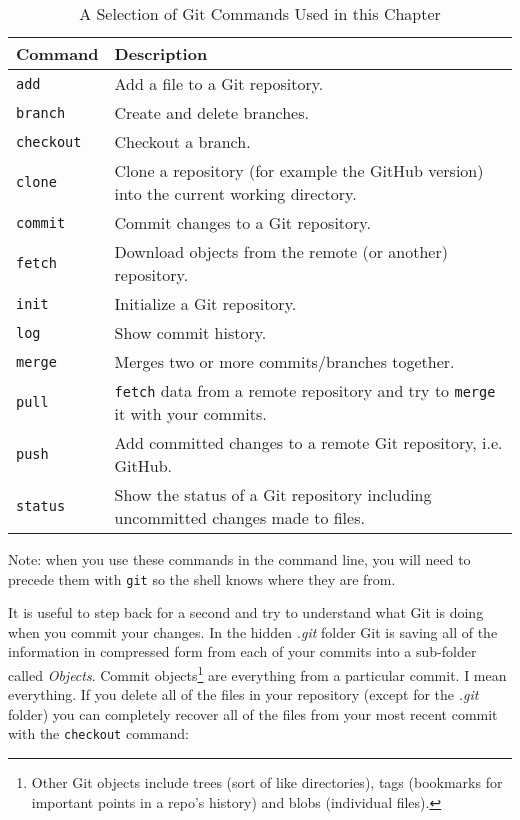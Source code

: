 \begin{table}
  \caption{A Selection of Git Commands Used in this Chapter}
  \begin{center}
  \label{GitCommandsTable}
  \begin{tabular}{l p{10cm}}
    \hline  
    Command & Description \\[0.25cm] \hline\hline
    \texttt{add} & Add a file to a Git repository. \\[0.25cm]
    \texttt{branch} & Create and delete branches. \\[0.25cm]
    \texttt{checkout} & Checkout a branch. \\[0.25cm]
    \texttt{clone} & Clone a repository (for example the GitHub version) into the current working directory. \\[0.25cm]
    \texttt{commit} & Commit changes to a Git repository. \\[0.25cm] 
    \texttt{fetch} & Download objects from the remote (or another) repository. \\[0.25cm] 
    \texttt{init} & Initialize a Git repository. \\[0.25cm]
    \texttt{log} & Show commit history. \\[0.25cm]
    \texttt{merge} & Merges two or more commits/branches together. \\[0.25cm]
    \texttt{pull} & \texttt{fetch} data from a remote repository and try to \texttt{merge} it with your commits. \\[0.25cm]
    \texttt{push} & Add committed changes to a remote Git repository, i.e. GitHub. \\[0.25cm]
    \texttt{status} & Show the status of a Git repository including uncommitted changes made to files. \\[0.25cm]
    \hline
  \end{tabular}
  \end{center}
  {\scriptsize{Note: when you use these commands in the command line, you will need to precede them with \texttt{git} so the shell knows where they are from.}}
\end{table}

It is useful to step back for a second and try to understand what Git is doing when you commit your changes. In the hidden {\emph{.git}} folder Git is saving all of the information in compressed form from each of your commits into a sub-folder called {\emph{Objects}}. Commit objects\footnote{Other Git objects include trees (sort of like directories), tags (bookmarks for important points in a repo's history) and blobs (individual files).} are everything from a particular commit. I mean everything. If you delete all of the files in your repository (except for the {\emph{.git}} folder) you can completely recover all of the files from your most recent commit with the \texttt{checkout} command:

